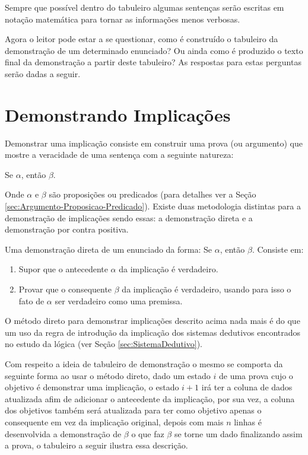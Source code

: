 \begin{rema}
	Sempre que possível dentro do tabuleiro algumas sentenças serão escritas em notação matemática para tornar as informações menos verbosas.
\end{rema}

Agora o leitor pode estar a se questionar, como é construído o tabuleiro da demonstração de um determinado enunciado? Ou ainda como é produzido o texto final da demonstração a partir deste tabuleiro? As respostas para estas perguntas serão dadas a seguir. 

\section{Demonstrando Implicações}\label{sec:ProvandoImplicacao}

Demonstrar uma implicação consiste em construir uma prova (ou argumento) que mostre a veracidade de uma sentença com a seguinte natureza: 

\begin{center}
	Se $\alpha$, então $\beta$. 
\end{center}

Onde $\alpha$ e $\beta$ são proposições ou predicados (para detalhes ver a Seção \ref{sec:Argumento-Proposicao-Predicado}). Existe duas metodologia distintas para a demonstração de implicações sendo essas: a demonstração direta e a demonstração por contra positiva.

\begin{method}[Direto]\label{metodo:Direto}
	Uma demonstração direta de um enunciado da forma: Se $\alpha$, então $\beta$.   Consiste em:
	\begin{enumerate}
		\item Supor que o antecedente $\alpha$ da implicação é verdadeiro.
		\item Provar que o consequente $\beta$ da implicação é verdadeiro, usando para isso o fato de $\alpha$ ser verdadeiro como uma premissa.
	\end{enumerate}
\end{method}

O método direto para demonstrar implicações descrito acima nada mais é do que um uso da regra de introdução da implicação dos sistemas dedutivos encontrados no estudo da lógica  (ver Seção  \ref{sec:SistemaDedutivo}). 

Com respeito a ideia de tabuleiro de demonstração o mesmo se comporta da seguinte forma ao usar o método direto, dado um estado $i$ de uma prova cujo o objetivo é demonstrar uma implicação, o estado $i+1$ irá ter a coluna de dados atualizada afim de adicionar o antecedente da implicação, por sua vez, a coluna dos objetivos também será atualizada para ter como objetivo apenas o consequente em vez da implicação original, depois com mais $n$ linhas é desenvolvida a demonstração de $\beta$ o que faz $\beta$ se torne um dado finalizando assim a prova, o tabuleiro a seguir ilustra essa descrição.

